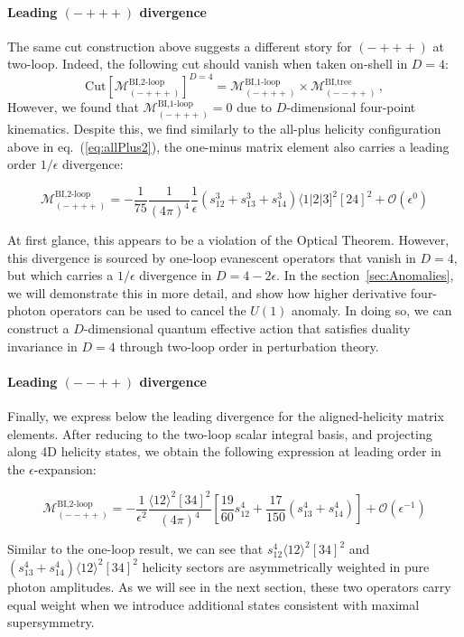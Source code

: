 \documentclass[11pt,letter]{article}
\def\sect#1{section~\ref{#1}}
\def\eqn#1{eq.~(\ref{#1})}
\begin{document}
\paragraph{Leading $(-+++)$ divergence} The same cut construction above suggests a different story for $(-+++)$ at two-loop. Indeed, the following cut should vanish when taken on-shell in $D=4$:
\begin{equation}
\text{Cut}\left[\mathcal{M}^{\text{BI,2-loop}}_{(-+++)} \right]^{D=4} = \mathcal{M}^{\text{BI,1-loop}}_{(-+++)} \times \mathcal{M}^{\text{BI,tree}}_{(--++)}\,,
\end{equation}
However, we found that $\mathcal{M}^{\text{BI,1-loop}}_{(-+++)} =0$ due to $D$-dimensional four-point kinematics. Despite this, we find similarly to the all-plus helicity configuration above in \eqn{eq:allPlus2}, the one-minus matrix element {also} carries a leading order $1/\epsilon$ divergence:
\begin{eBox}
\begin{equation}
\mathcal{M}^{\text{BI,2-loop}}_{(-+++)} =- \frac{1}{75} \frac{1}{(4\pi)^4}\frac{1}{\epsilon}(s_{12}^3+s_{13}^3+s_{14}^3) \langle 1|2|3]^2[24]^2 +\mathcal{O}(\epsilon^0)
\label{eq:oneMinus2loop}
\end{equation}
\end{eBox}
At first glance, this appears to be a violation of the Optical Theorem. However, this divergence is sourced by one-loop evanescent operators that vanish in $D=4$, but which carries a $1/\epsilon$ divergence in $D=4-2\epsilon$. In the \sect{sec:Anomalies}, we will demonstrate this in more detail, and show how higher derivative four-photon operators can be used to cancel the $U(1)$ anomaly. In doing so, we can construct a $D$-dimensional quantum effective action that satisfies duality invariance in $D=4$ through two-loop order in perturbation theory.  
\paragraph{Leading $(--++)$ divergence} 
Finally, we express below the leading divergence for the aligned-helicity matrix elements. After reducing to the two-loop scalar integral basis, and projecting along 4D helicity states, we obtain the following expression at leading order in the $\epsilon$-expansion:
\begin{eBox}
\begin{equation}
\mathcal{M}^{\text{BI,2-loop}}_{(--++)} = -\frac{1}{\epsilon^2}\frac{\langle12\rangle^2[34]^2}{(4\pi)^4}\left[\frac{19}{60}s_{12}^4+\frac{17}{150}(s_{13}^4+s_{14}^4)\right]+\mathcal{O}(\epsilon^{-1})
\end{equation}
\end{eBox}
Similar to the one-loop result, we can see that $s_{12}^4 \langle12\rangle^2[34]^2$ and $(s_{13}^4+s_{14}^4)\langle12\rangle^2[34]^2$ helicity sectors are asymmetrically weighted in pure photon amplitudes. As we will see in the next section, these two operators carry equal weight when we introduce additional states consistent with maximal supersymmetry. 
\end{document}
